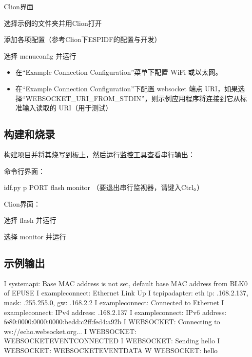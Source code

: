\documentclass[a4paper,12pt,english]{sphinxmanual}
\begin{document}
{{\sphinxAtStartPar
Clion界面

\sphinxAtStartPar
选择示例的文件夹并用Clion打开

\sphinxAtStartPar
添加各项配置（参考Clion下ESP\sphinxhyphen{}IDF的配置与开发）

\sphinxAtStartPar
选择 menuconfig 并运行
\begin{itemize}
\item {} 
\sphinxAtStartPar
在“Example Connection Configuration”菜单下配置 Wi\sphinxhyphen{}Fi 或以太网。

\item {} 
\sphinxAtStartPar
在“Example Connection Configuration”下配置 websocket 端点 URI，如果选择“WEBSOCKET\_URI\_FROM\_STDIN”，则示例应用程序将连接到它从标准输入读取的 URI（用于测试）

\end{itemize}


\subsection{构建和烧录}
\label{\detokenize{exp-esp32/websocket:id7}}
\sphinxAtStartPar
构建项目并将其烧写到板上，然后运行监控工具查看串行输出：

\sphinxAtStartPar
命令行界面：

\sphinxAtStartPar
idf.py \sphinxhyphen{}p PORT flash monitor
（要退出串行监视器，请键入Ctrl\sphinxhyphen{}{]}。）

\sphinxAtStartPar
Clion界面：

\sphinxAtStartPar
选择 flash 并运行

\sphinxAtStartPar
选择 monitor 并运行


\subsection{示例输出}
\label{\detokenize{exp-esp32/websocket:id8}}
\begin{sphinxVerbatim}[commandchars=\\\{\}]
I  system\PYGZus{}api: Base MAC address is not set,  default base MAC address from BLK0 of EFUSE
I  example\PYGZus{}connect: Ethernet Link Up
I  tcpip\PYGZus{}adapter: eth ip: .168.2.137, mask: .255.255.0, gw: .168.2.2
I  example\PYGZus{}connect: Connected to Ethernet
I  example\PYGZus{}connect: IPv4 address: .168.2.137
I  example\PYGZus{}connect: IPv6 address: fe80:0000:0000:0000:bedd:c2ff:fed4:a92b
I  WEBSOCKET: Connecting to ws://echo.websocket.org...
I  WEBSOCKET: WEBSOCKET\PYGZus{}EVENT\PYGZus{}CONNECTED
I  WEBSOCKET: Sending hello 
I  WEBSOCKET: WEBSOCKET\PYGZus{}EVENT\PYGZus{}DATA
W  WEBSOCKET: hello 


\end{sphinxVerbatim}}}
\end{document}
